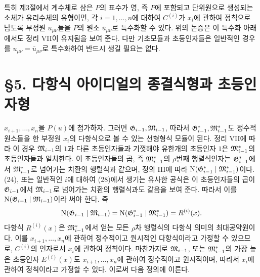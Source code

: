 특히 제3절에서 계수체로 삼은 \(P\)의 표수가 영, 즉 \(P\)에 포함되고 단위원으로 생성되는 소체가 유리수체의 유형이면, 각 \(i=1,\ldots,n\)에 대하여 \(C^{(i)}\)가 \(x_i\)에 관하여 정칙으로 남도록 부정원 \(u_{\mu\nu}\)들을 \(P\)의 원소 \(\bar u_{\mu\nu}\)로 특수화할 수 있다. 위의 논증은 이 특수화 아래에서도 정리 VII이 유지됨을 보여 준다. 다만 기초모듈과 초등인자들은 일반적인 경우를 \(u_{\mu\nu}=\bar u_{\mu\nu}\)로 특수화하여 반드시 생길 필요는 없다.

\section*{\S{}5. 다항식 아이디얼의 종결식형과 초등인자형}

\(x_{i+1},\ldots,x_n\)을 \(P(u)\)에 첨가하자. 그러면 \(\mathfrak G_{i-1},\mathfrak M_{i-1}\), 따라서 \(\mathfrak G^*_{i-1},\mathfrak M^*_{i-1}\)도 정수적 원소들을 한 부정원 \(x_i\)의 다항식으로 볼 수 있는 선형형식 모듈이 된다. 정리 VII에 따라 이 경우 \(\mathfrak M_{i-1}\)의 \(1\)과 다른 초등인자들과 기껏해야 유한개의 초등인자 \(1\)은 \(\mathfrak M^*_{i-1}\)의 초등인자들과 일치한다. 이 초등인자들의 곱, 즉 \(\mathfrak M^*_{i-1}\)의 \(\rho\)번째 행렬식인자는 \(\mathfrak G^*_{i-1}\)에서 \(\mathfrak M^*_{i-1}\)로 넘어가는 치환의 행렬식과 같으며, 정의 III에 따라 \(\operatorname N(\mathfrak G^*_{i-1}\mid\mathfrak M^*_{i-1})\)이다. (24), 또는 일반적인 \(i\)에 대하여 (28)에서 생기는 유사한 공식은 이 초등인자들의 곱이 \(\mathfrak G_{i-1}\)에서 \(\mathfrak M_{i-1}\)로 넘어가는 치환의 행렬식과도 같음을 보여 준다. 따라서 이를 \(\operatorname N(\mathfrak G_{i-1}\mid\mathfrak M_{i-1})\)이라 써야 한다. 즉
\[
\operatorname N(\mathfrak G_{i-1}\mid\mathfrak M_{i-1})
=\operatorname N(\mathfrak G^*_{i-1}\mid\mathfrak M^*_{i-1})
=R^{(i)}(x).
\]
다항식 \(R^{(i)}(x)\)은 \(\mathfrak M^*_{i-1}\)에서 얻는 모든 \(\rho\)차 행렬식의 다항식 의미의 최대공약원이다. 이를 \(x_{i+1},\ldots,x_n\)에 관하여 정수적이고 원시적인 다항식이라고 가정할 수 있으므로, \(C^{(i)}\)의 인자로서 \(x_i\)에 관하여 정칙이다. 마찬가지로 \(\mathfrak M_{i-1}\), 또는 \(\mathfrak M^*_{i-1}\)의 가장 높은 초등인자 \(E^{(i)}(x)\)도 \(x_{i+1},\ldots,x_n\)에 관하여 정수적이고 원시적이며, 따라서 \(x_i\)에 관하여 정칙이라고 가정할 수 있다. 이로써 다음 정의에 이른다.

